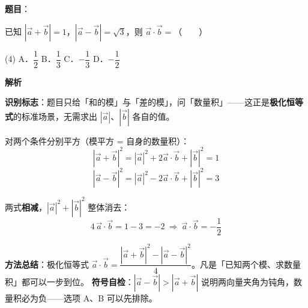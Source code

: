 \begin{answer}

\textbf{题目}：

已知 $\left|\vec{a}+\vec{b}\right|=1$，$\left|\vec{a}-\vec{b}\right|=\sqrt{3}$，则 $\vec{a}\cdot\vec{b}=$\mbox{（　　）}

\begin{gkopts}(4)
\task A．$\dfrac{1}{2}$
\task B．$\dfrac{1}{3}$
\task C．$-\dfrac{1}{3}$
\task D．$-\dfrac{1}{2}$
\end{gkopts}

\textbf{解析}

\textbf{识别标志}：题目只给「和的模」与「差的模」，问「数量积」——这正是\textbf{极化恒等式}的标准场景，无需求出 $\left|\vec a\right|$、$\left|\vec b\right|$ 各自的值。

对两个条件分别平方（模平方 = 自身的数量积）：
\nopagebreak[4]
\[\left|\vec a+\vec b\right|^2=\left|\vec a\right|^2+2\vec a\cdot\vec b+\left|\vec b\right|^2=1\]
\nopagebreak[4]
\[\left|\vec a-\vec b\right|^2=\left|\vec a\right|^2-2\vec a\cdot\vec b+\left|\vec b\right|^2=3\]

两式\textbf{相减}，$\left|\vec a\right|^2+\left|\vec b\right|^2$ 整体消去：
\nopagebreak[4]
\[4\,\vec a\cdot\vec b=1-3=-2\ \Longrightarrow\ \vec a\cdot\vec b=-\frac12\]

\begin{gktip}
\textbf{方法总结}：极化恒等式 $\vec a\cdot\vec b=\dfrac{\left|\vec a+\vec b\right|^2-\left|\vec a-\vec b\right|^2}{4}$。凡是「已知两个模、求数量积」都可以一步到位。
\textbf{符号自检}：$\left|\vec a-\vec b\right|>\left|\vec a+\vec b\right|$ 说明两向量夹角为钝角，数量积必为负——选项 A、B 可以先排除。
\end{gktip}


\par\medskip

\end{answer}
